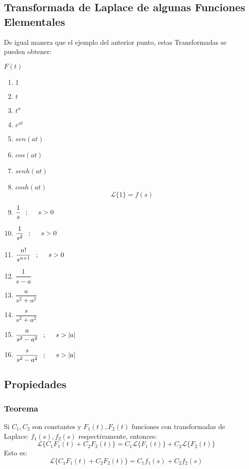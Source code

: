 \subsection*{Transformada de Laplace de algunas Funciones Elementales}
De igual manera que el ejemplo del anterior punto, estas Transformadas se pueden obtener:
\begin{multicols}{2}
\begin{center}
$F(t)$
\end{center}
\begin{enumerate}[1)]
\item $1$
\item $t$ 
\item $t^n$
\item $e^{at}$
\item $sen(at)$
\item $cos(at)$
\item $senh(at)$
\item $cosh(at)$
\columnbreak
$$\mathscr{L} \lbrace 1\rbrace=f(s)$$
\item[] $\dfrac{1}{s} \hspace{0.25cm};\hspace{0.5cm}s>0$
\item[] $\dfrac{1}{s^2} \hspace{0.25cm};\hspace{0.5cm}s>0$
\item[] $\dfrac{n!}{s^{n+1}} \hspace{0.25cm};\hspace{0.5cm}s>0$
\item[] $\dfrac{1}{s-a}$
\item[] $\dfrac{a}{s^2+a^2}$
\item[] $\dfrac{s}{s^2+a^2}$
\item[] $\dfrac{a}{s^2-a^2} \hspace{0.25cm};\hspace{0.5cm}s>|a|$
\item[] $\dfrac{s}{s^2-a^2} \hspace{0.25cm};\hspace{0.5cm}s>|a|$
\end{enumerate}
\end{multicols}
\subsection*{Propiedades}
\subsubsection*{Teorema}
Si $C_1,C_2$ son constantes y $F_1(t),F_2(t)$ funciones con transformadas de Laplace: $f_1(s),f_2(s)$ respectivamente, entonces:
$$\mathscr{L} \lbrace C_1 F_1(t)+C_2 F_2(t) \rbrace = C_1\mathscr{L}\lbrace F_1(t)\rbrace + C_2\mathscr{L}\lbrace F_2(t)\rbrace$$
Esto es:
$$\mathscr{L} \lbrace C_1 F_1(t)+C_2 F_2(t) \rbrace = C_1 f_1(s) +  C_2 f_2(s)$$